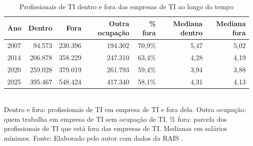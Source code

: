 \begin{table}[htbp]
    \centering
    \caption{Profissionais de TI dentro e fora das empresas de TI ao longo do tempo}
    \label{tab:lentes-evolucao}
    \footnotesize
    \renewcommand{\arraystretch}{1.25}
    \begin{tabular}{lrrrrrr}
        \toprule
        \rowcolor{black!8}
        \textbf{Ano} & \textbf{Dentro} & \textbf{Fora} & \textbf{Outra ocupação} & \textbf{\% fora} & \textbf{Mediana dentro} & \textbf{Mediana fora} \\
        \midrule
        2007 & 94.573 & 230.396 & 194.302 & 70,9\% & 5,47 & 5,02 \\
        2014 & 206.878 & 358.229 & 247.310 & 63,4\% & 4,28 & 4,19 \\
        2020 & 259.028 & 379.019 & 261.793 & 59,4\% & 3,94 & 3,88 \\
        2025 & 395.467 & 548.424 & 417.340 & 58,1\% & 4,31 & 4,13 \\
        \bottomrule
    \end{tabular}
    \\[4pt]
    Dentro e fora: profissionais de TI em empresa de TI e fora dela. Outra ocupação: quem trabalha em empresa de TI sem ocupação de TI. \% fora: parcela dos profissionais de TI que está fora das empresas de TI. Medianas em salários mínimos. Fonte: Elaborado pelo autor com dados da RAIS \cite{RAIS2024}.
\end{table}
